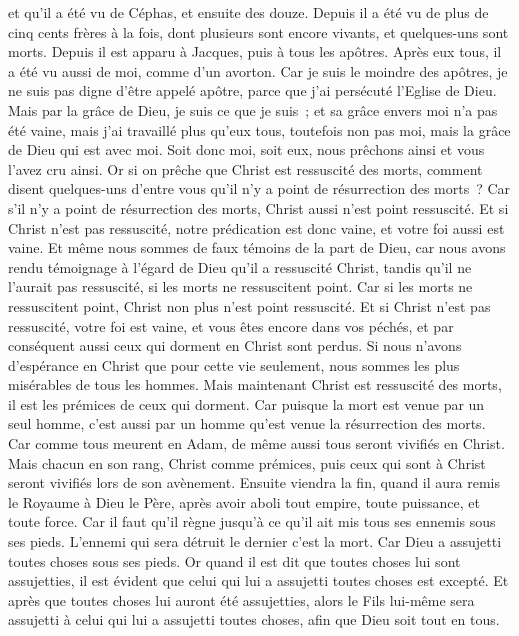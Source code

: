 \begin{multicols}{2}
et qu'il a été vu de Céphas, et ensuite des douze.
Depuis il a été vu de plus de cinq cents frères à la fois, dont plusieurs sont encore vivants, et quelques-uns sont morts.
Depuis il est apparu à Jacques, puis à tous les apôtres.
Après eux tous, il a été vu aussi de moi, comme d'un avorton.
Car je suis le moindre des apôtres, je ne suis pas digne d'être appelé apôtre, parce que j'ai persécuté l'Eglise de Dieu.
Mais par la grâce de Dieu, je suis ce que je suis~; et sa grâce envers moi n'a pas été vaine, mais j'ai travaillé plus qu'eux tous, toutefois non pas moi, mais la grâce de Dieu qui est avec moi.
Soit donc moi, soit eux, nous prêchons ainsi et vous l'avez cru ainsi.
Or si on prêche que Christ est ressuscité des morts, comment disent quelques-uns d'entre vous qu'il n'y a point de résurrection des morts~?
Car s'il n'y a point de résurrection des morts, Christ aussi n'est point ressuscité.
Et si Christ n'est pas ressuscité, notre prédication est donc vaine, et votre foi aussi est vaine.
Et même nous sommes de faux témoins de la part de Dieu, car nous avons rendu témoignage à l'égard de Dieu qu'il a ressuscité Christ, tandis qu'il ne l'aurait pas ressuscité, si les morts ne ressuscitent point.
Car si les morts ne ressuscitent point, Christ non plus n'est point ressuscité.
Et si Christ n'est pas ressuscité, votre foi est vaine, et vous êtes encore dans vos péchés,
et par conséquent aussi ceux qui dorment en Christ sont perdus.
Si nous n'avons d'espérance en Christ que pour cette vie seulement, nous sommes les plus misérables de tous les hommes.
Mais maintenant Christ est ressuscité des morts, il est les prémices de ceux qui dorment.
Car puisque la mort est venue par un seul homme, c'est aussi par un homme qu'est venue la résurrection des morts.
Car comme tous meurent en Adam, de même aussi tous seront vivifiés en Christ.
Mais chacun en son rang, Christ comme prémices, puis ceux qui sont à Christ seront vivifiés lors de son avènement.
Ensuite viendra la fin, quand il aura remis le Royaume à Dieu le Père, après avoir aboli tout empire, toute puissance, et toute force.
Car il faut qu'il règne jusqu'à ce qu'il ait mis tous ses ennemis sous ses pieds.
L'ennemi qui sera détruit le dernier c'est la mort.
Car Dieu a assujetti toutes choses sous ses pieds. Or quand il est dit que toutes choses lui sont assujetties, il est évident que celui qui lui a assujetti toutes choses est excepté.
Et après que toutes choses lui auront été assujetties, alors le Fils lui-même sera assujetti à celui qui lui a assujetti toutes choses, afin que Dieu soit tout en tous.

\end{multicols}
